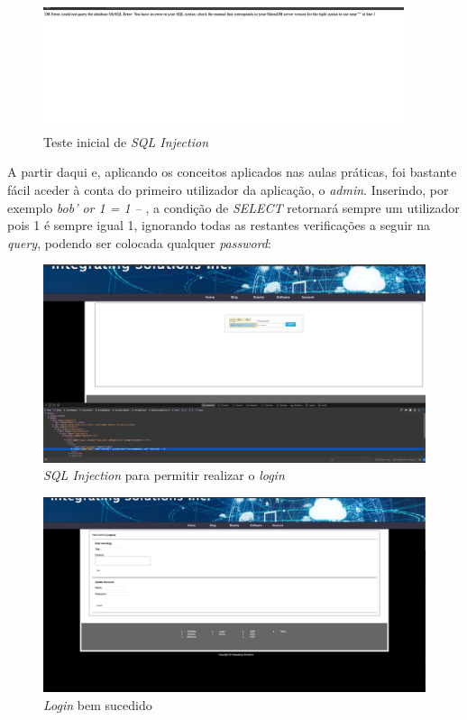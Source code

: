 \documentclass[10pt,english]{article}
\begin{document}
\begin{itemize}
    \begin{figure}[!h]
        \centering
        \includegraphics[width=400]{images/login_error.png}
        \caption{Teste inicial de \textit{SQL Injection}}
    \end{figure}
    
    \par A partir daqui e, aplicando os conceitos aplicados nas aulas práticas, foi bastante fácil aceder à conta do primeiro utilizador da aplicação, o \textit{admin}. Inserindo, por exemplo \textit{bob' or 1 = 1 -- }, a condição de \textit{SELECT} retornará sempre um utilizador pois 1 é sempre igual 1, ignorando todas as restantes verificações a seguir na \textit{query}, podendo ser colocada qualquer \textit{password}:
    
     \begin{figure}[!h]
        \centering
        \includegraphics[width=\textwidth]{images/login_type.png}
        \caption{\textit{SQL Injection} para permitir realizar o \textit{login}}
    \end{figure}
    
    \begin{figure}[!h]
        \centering
        \includegraphics[width=\textwidth]{images/login_done.png}
        \caption{\textit{Login} bem sucedido}
    \end{figure}
    

\end{itemize}
\end{document}
